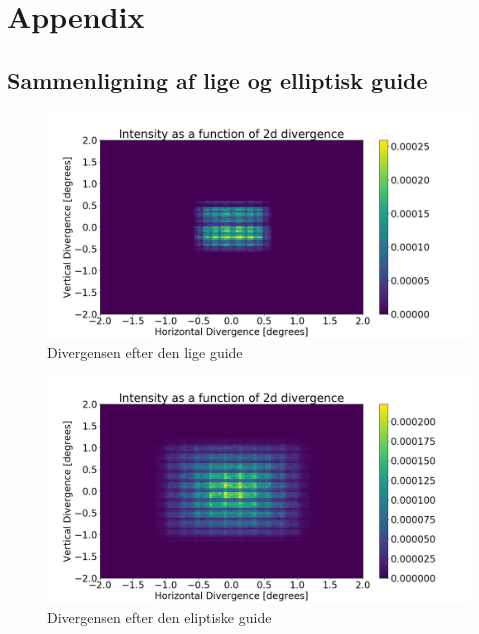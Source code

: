 \documentclass[12pt,oneside,a4paper]{article}
\begin{document}
{{{{{%
\newpage

 

\newpage

\appendix
\section{Appendix}

\subsection{Sammenligning af lige og elliptisk guide}

\begin{figure}[H]
\centering
\includegraphics[width=1\textwidth]{div_straight_after.png}
\caption{Divergensen efter den lige guide}  \label{ap:div_straight_after}
\end{figure}


\begin{figure}[H]
\centering
\includegraphics[width=1\textwidth]{div_ellipse_after.png}
\caption{Divergensen efter den eliptiske guide} \label{ap:div_ellipse_after}
\end{figure}


}}}}}
\end{document}
